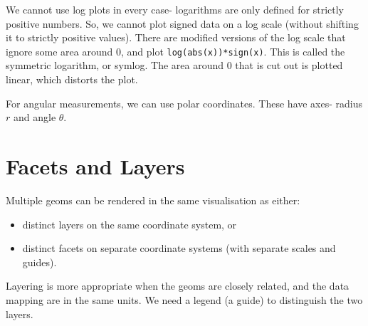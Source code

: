 \documentclass[a4paper, openany]{memoir}
\begin{document}
We cannot use log plots in every case- logarithms are only defined for strictly positive numbers. So, we cannot plot signed data on a log scale (without shifting it to strictly positive values). There are modified versions of the log scale that ignore some area around 0, and plot \texttt{log(abs(x))*sign(x)}. This is called the symmetric logarithm, or symlog. The area around 0 that is cut out is plotted linear, which distorts the plot.

For angular measurements, we can use polar coordinates. These have axes- radius $r$ and angle $\theta$.

\section{Facets and Layers}
Multiple geoms can be rendered in the same visualisation as either:
\begin{itemize}
    \item distinct layers on the same coordinate system, or
    \item distinct facets on separate coordinate systems (with separate scales and guides).
\end{itemize}
Layering is more appropriate when the geoms are closely related, and the data mapping are in the same units. We need a legend (a guide) to distinguish the two layers.
\end{document}
